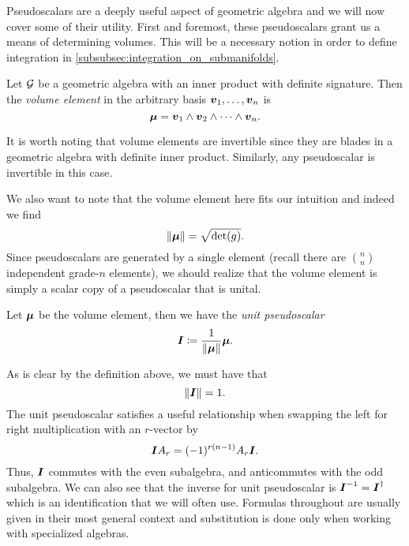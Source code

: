 Pseudoscalars are a deeply useful aspect of geometric algebra and we will now cover some of their utility. First and foremost, these pseudoscalars grant us a means of determining volumes. This will be a necessary notion in order to define integration in \cref{subsubsec:integration_on_submanifolds}.
\begin{definition}
Let $\mathcal{G}$ be a geometric algebra with an inner product with definite signature. Then the \emph{volume element} in the arbitrary basis $\boldsymbol{v}_1,\dots,\boldsymbol{v}_n$ is 
\begin{equation}
\boldsymbol{\mu}=\boldsymbol{v}_1 \wedge \boldsymbol{v}_2 \wedge \cdots \wedge \boldsymbol{v}_n.
\end{equation}
\end{definition}
It is worth noting that volume elements are invertible since they are blades in a geometric algebra with definite inner product. Similarly, any pseudoscalar is invertible in this case. 

We also want to note that the volume element here fits our intuition and indeed we find
\begin{equation}
\label{eq:pseudoscalar_norm}
\|\boldsymbol{\mu}\| = \sqrt{\det(g)}.
\end{equation}
Since pseudoscalars are generated by a single element (recall there are ${n \choose n}$ independent grade-$n$ elements), we should realize that the volume element is simply a scalar copy of a pseudoscalar that is unital.
\begin{definition}
Let $\boldsymbol{\mu}$ be the volume element, then we have the \emph{unit pseudoscalar}
\begin{equation}
\boldsymbol{I} \coloneqq \frac{1}{\|\boldsymbol{\mu}\|} \boldsymbol{\mu}.
\end{equation}
\end{definition}
As is clear by the definition above, we must have that
\begin{equation}
\|\boldsymbol{I}\| = 1.
\end{equation}
The unit pseudoscalar satisfies a useful relationship when swapping the left for right multiplication with an $r$-vector by
\begin{equation}
\boldsymbol{I} A_r = (-1)^{r(n-1)} A_r \boldsymbol{I}.
\end{equation}
Thus, $\boldsymbol{I}$ commutes with the even subalgebra, and anticommutes with the odd subalgebra. We can also see that the inverse for unit pseudoscalar is $\boldsymbol{I}^{-1}=\boldsymbol{I}^\dagger$ which is an identification that we will often use. Formulas throughout are usually given in their most general context and substitution is done only when working with specialized algebras.  


